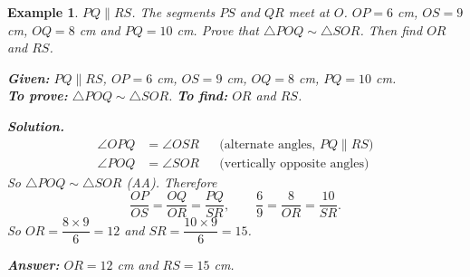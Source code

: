 \documentclass[11pt,a4paper]{article}
\theoremstyle{brand}
\theoremstyle{branddef}
\newtheorem{example}{Example}[section]
\newcommand{\tr}{\triangle}
\newcommand{\slab}[4][0.5]{\path (#2) -- (#3) node[pos=#1, auto=right, inner sep=2.5pt] {#4};}
\begin{document}
\begin{example}
$PQ\parallel RS$. The segments $PS$ and $QR$ meet at $O$. $OP=6$ cm, $OS=9$ cm, $OQ=8$ cm and $PQ=10$ cm. Prove that $\tr POQ\sim\tr SOR$. Then find $OR$ and $RS$.

\begin{center}\end{center}

\textbf{Given:} $PQ\parallel RS$, $OP=6$ cm, $OS=9$ cm, $OQ=8$ cm, $PQ=10$ cm.\\
\textbf{To prove:} $\tr POQ\sim\tr SOR$. \textbf{To find:} $OR$ and $RS$.

\textbf{Solution.}
\[
\begin{aligned}
\angle OPQ&=\angle OSR &&\text{(alternate angles, $PQ\parallel RS$)}\\
\angle POQ&=\angle SOR &&\text{(vertically opposite angles)}
\end{aligned}
\]
So $\tr POQ\sim\tr SOR$ (AA). Therefore
\[
\dfrac{OP}{OS}=\dfrac{OQ}{OR}=\dfrac{PQ}{SR},\qquad \dfrac69=\dfrac{8}{OR}=\dfrac{10}{SR}.
\]
So $OR=\dfrac{8\times9}{6}=12$ and $SR=\dfrac{10\times9}{6}=15$.

\textbf{Answer:} $OR=12$ cm and $RS=15$ cm.
\end{example}
\end{document}
